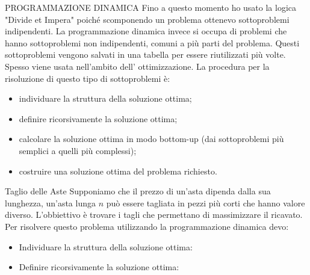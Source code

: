 \documentclass[8pt]{extarticle}
\begin{document}
\begin{formulario}
	\begin{myParagraph}{PROGRAMMAZIONE DINAMICA}
Fino a questo momento ho usato la logica "Divide et Impera" poiché scomponendo un problema ottenevo sottoproblemi indipendenti. La programmazione dinamica invece si occupa di problemi che hanno sottoproblemi non indipendenti, comuni a più parti del problema. Questi sottoproblemi vengono salvati in una tabella per essere riutilizzati più volte. Spesso viene usata nell'ambito dell' ottimizzazione. La procedura per la risoluzione di questo tipo di sottoproblemi è:
			\begin{itemize} 
				\item individuare la struttura della soluzione ottima;
				\item definire ricorsivamente la soluzione ottima;
				\item calcolare la soluzione ottima in modo bottom-up (dai sottoproblemi più semplici a quelli più complessi);
				\item costruire una soluzione ottima del problema richiesto.
			\end{itemize}
		\begin{subParagraph}{Taglio delle Aste}
Supponiamo che il prezzo di un'asta dipenda dalla sua lunghezza, un'asta lunga $n$ può essere tagliata in pezzi più corti che hanno valore diverso. L'obbiettivo è trovare i tagli che permettano di massimizzare il ricavato. \\
Per risolvere questo problema utilizzando la programmazione dinamica devo:
			\begin{itemize}
				\item Individuare la struttura della soluzione ottima:\\
				\item Definire ricorsivamente la soluzione ottima:\\

\end{itemize}
\end{subParagraph}
\end{myParagraph}
\end{formulario}
\end{document}
